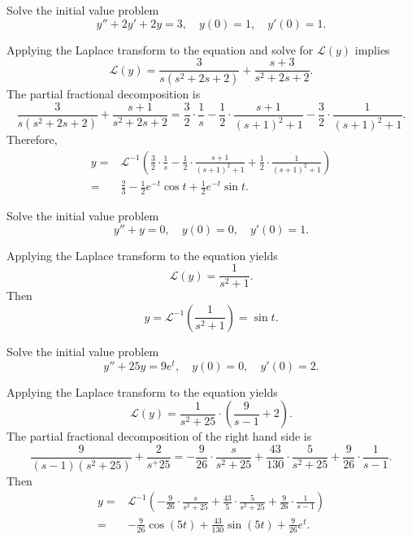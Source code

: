 \begin{example}
  Solve the initial value problem
\[y''+2y'+2y=3, \quad y(0)=1,\quad y'(0)=1.\]
\end{example}
\begin{solution}
  Applying the Laplace transform to the equation and solve for $\mathcal{L}(y)$ implies
  \[\mathcal{L}(y)=\frac{3}{s(s^2+2s+2)}+\frac{s+3}{s^2+2s+2}.\]
The partial fractional decomposition is
\[\frac{3}{s(s^2+2s+2)}+\frac{s+1}{s^2+2s+2}=\frac{3}{2}\cdot\frac{1}{s}-\frac{1}{2}\cdot\frac{s+1}{(s+1)^2+1}-\frac{3}{2}\cdot\frac{1}{(s+1)^2+1}.\]
Therefore,
\[
  \begin{aligned}
  y=&\mathcal{L}^{-1}\left(\frac{3}{2}\cdot\frac{1}{s}-\frac{1}{2}\cdot\frac{s+1}{(s+1)^2+1}+\frac{1}{2}\cdot\frac{1}{(s+1)^2+1}\right)\\
  =&\frac23-\frac12e^{-t}\cos t+\frac12e^{-t}\sin t.
  \end{aligned}  
\]
\end{solution}

\begin{exercise}
Solve the initial value problem
\[y''+y=0,\quad y(0)=0,\quad y'(0)=1.\]
\end{exercise}
\begin{solution}
  Applying the Laplace transform to the equation yields
  \[\mathcal{L}(y)=\frac{1}{s^2+1}.\]
  Then
  \[y=\mathcal{L}^{-1}\left(\frac1{s^2+1}\right)=\sin t.\]
\end{solution}

\begin{exercise}
  Solve the initial value problem
\[y''+ 25 y=9e^t,\quad y(0)=0,\quad y'(0)=2.\]
\end{exercise}
\begin{solution}
  Applying the Laplace transform to the equation yields
  \[\mathcal{L}(y)=\frac{1}{s^2+25}\cdot\left(\frac{9}{s-1}+2\right).\]
  The partial fractional decomposition of the right hand side is
  \[\frac{9}{(s-1)(s^2+25)}+\frac{2}{s^+25}=-\frac{9}{26}\cdot\frac{s}{s^2+25}+\frac{43}{130}\cdot\frac{5}{s^2+25}+\frac{9}{26}\cdot\frac{1}{s-1}.\]
  Then
  \[
    \begin{aligned}
      y=&\mathcal{L}^{-1}\left(-\frac{9}{26}\cdot\frac{s}{s^2+25}+\frac{43}{5}\cdot\frac{5}{s^2+25}+\frac{9}{26}\cdot\frac{1}{s-1}\right)\\
      =&-\frac{9}{26}\cos(5t)+\frac{43}{130}\sin(5t)+\frac{9}{26}e^t.
    \end{aligned}
    \]
\end{solution}

